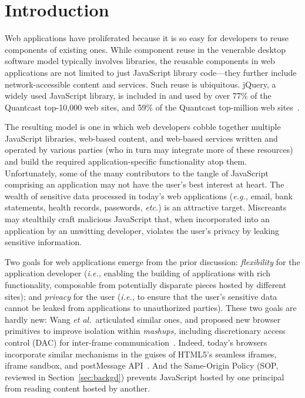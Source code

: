 \section{Introduction}
\label{sec:intro}

Web applications have proliferated because it is so easy for
developers to reuse components of existing ones. While component reuse
in the venerable desktop software model typically involves libraries,
the reusable components in web applications are not limited to just
JavaScript library code---they further include network-accessible
content and services. Such reuse is ubiquitous\@. jQuery, a widely used
JavaScript library, is included in and used by over 77\% of the
Quantcast top-10,000 web sites, and 59\% of the Quantcast top-million
web sites~\cite{quantcast}.

The resulting model is one in which web developers cobble together
multiple JavaScript libraries, web-based content, and web-based
services written and operated by various parties (who in turn may
integrate more of these resources) and build the required
application-specific functionality atop them. Unfortunately, some of
the many contributors to the tangle of JavaScript comprising an
application may not have the user's best interest at heart. The wealth
of sensitive data processed in today's web applications (\emph{e.g.,} email,
bank statements, health records, passwords, \emph{etc.}) is an attractive
target. Miscreants may stealthily craft malicious JavaScript that,
when incorporated into an application by an unwitting developer,
violates the user's privacy by leaking sensitive information.

Two goals for web applications emerge from the prior discussion:
\emph{flexibility} for the application developer (\emph{i.e.,} enabling the
building of applications with rich functionality, composable from
potentially disparate pieces hosted by different sites); and
\emph{privacy} for the user (\emph{i.e.,} to ensure that the user's sensitive
data cannot be leaked from applications to unauthorized parties).
These two goals are hardly new: Wang {\em et al.}\ articulated similar
ones, and proposed new browser primitives to improve isolation within
{\em mashups,} including discretionary access control (DAC) for inter-frame
communication~\cite{mashupos}. Indeed, today's browsers incorporate
similar mechanisms in the guises of HTML5's seamless iframes, iframe
sandbox, and postMessage API\@~\cite{html5}. And the Same-Origin Policy
(SOP, reviewed in Section~\ref{sec:backgd}) prevents JavaScript hosted
by one principal from reading content hosted by another.

